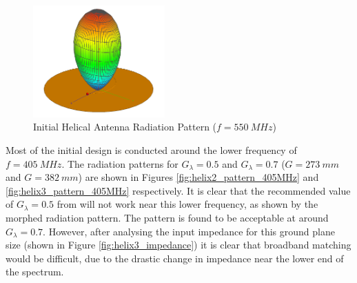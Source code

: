 \begin{figure}[!htb]
  \centering
  \includegraphics[width=0.45\textwidth]{helix1_pattern_550MHz}
  \caption{Initial Helical Antenna Radiation Pattern ($f=\SI{550}{MHz}$)}
  \label{fig:helix1_pattern_550MHz}
\end{figure}

Most of the initial design is conducted around the lower frequency of $f = \SI{405}{MHz}$. The radiation patterns for $G_\lambda = 0.5$ and $G_\lambda = 0.7$ ($G = \SI{273}{mm}$ and $G = \SI{382}{mm}$) are shown in Figures \ref{fig:helix2_pattern_405MHz} and \ref{fig:helix3_pattern_405MHz} respectively. It is clear that the recommended value of $G_\lambda = 0.5$ from \cite{textbook-antennaTheoryAnalysisDesign} will not work near this lower frequency, as shown by the morphed radiation pattern. The pattern is found to be acceptable at around $G_\lambda = 0.7$. However, after analysing the input impedance for this ground plane size (shown in Figure \ref{fig:helix3_impedance}) it is clear that broadband matching would be difficult, due to the drastic change in impedance near the lower end of the spectrum.

